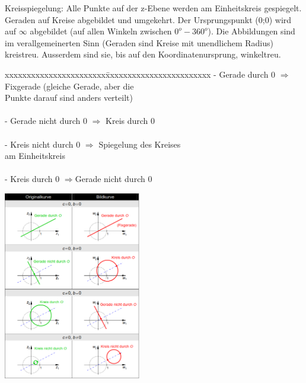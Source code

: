 	\begin{minipage}{9cm}
		Kreisspiegelung: Alle Punkte auf der z-Ebene werden am Einheitskreis gespiegelt.
		Geraden auf Kreise abgebildet und umgekehrt. Der Ursprungspunkt (0;0) wird auf
		$ \infty $ abgebildet (auf allen Winkeln zwischen $0^o-360^o$). Die
		Abbildungen sind
		im verallgemeinerten Sinn (Geraden sind Kreise mit unendlichem Radius)
		kreistreu. Ausserdem sind sie, bis auf den Koordinatenursprung, winkeltreu.\\
		\begin{tabbing}
        	xxxxxxxxxxxxxxxxxxxxxxx\=xxxxxxxxxxxxxxxxxxxxxxxx\kill
	        - Gerade durch 0 $\Longrightarrow$ \>Fixgerade (gleiche Gerade, aber
	        die \\ \>Punkte darauf sind anders verteilt)\\ \\
			- Gerade nicht durch 0 $\Longrightarrow$ Kreis durch 0\\ \\ 
			- Kreis nicht durch 0 $\Longrightarrow$ \>Spiegelung des Kreises\\ \> am Einheitskreis\\ \\
			- Kreis durch 0 $\Longrightarrow$\>Gerade nicht durch 0
        \end{tabbing}
	\end{minipage}
	\hspace{2cm}
	\begin{minipage}{6cm}
		\includegraphics[width=6cm]{./bilder/Kurvenspiegelung.png}
    \end{minipage}


